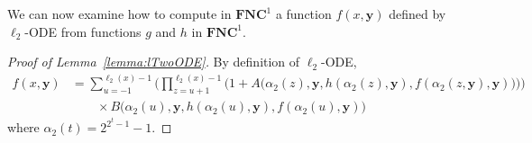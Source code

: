 \documentclass[11pt, oneside]{article}
\newenvironment{toappendix}{}{}
\newcommand{\NC}{\mathbf{FNC}}
\newcommand{\tu}[1]{\mathbf{#1}}
\theoremstyle{definition}
\begin{document}
\begin{toappendix}








We can now examine how to compute in $\NC^1$ a function $f(x, \tu y)$ defined by $\ell_2$-ODE from functions $g$ and $h$ in $\NC^1$.

\begin{proof}[Proof of Lemma~\ref{lemma:lTwoODE}]
    By definition of $\ell_2$-ODE,
    \begin{align*}
        f(x, \tu y) &= \sum^{\ell_2(x)-1}_{u=-1} \Bigg(\prod^{\ell_2(x)-1}_{z=u+1} \bigg(1+A\big(\alpha_2(z), \tu y, h(\alpha_2(z), \tu y), f(\alpha_2(z,\tu y),\tu y)\big)\bigg)\Bigg) \\
        & \quad \quad \times B\big(\alpha_2(u), \tu y, h(\alpha_2(u), \tu y), f(\alpha_2(u), \tu y)\big)
    \end{align*}
    where $\alpha_2(t)=2^{2^t-1}-1$.


\end{proof}
\end{toappendix}
\end{document}
